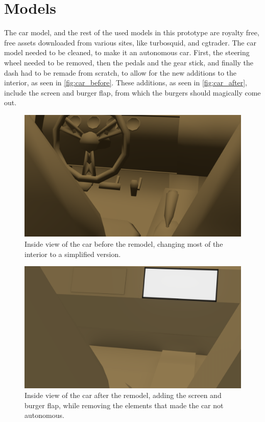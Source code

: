 \section{Models}\label{section:models}
    The car model, and the rest of the used models in this prototype are royalty free, free assets downloaded from various sites, like turbosquid, and cgtrader. The car model needed to be cleaned, to make it an autonomous car. First, the steering wheel needed to be removed, then the pedals and the gear stick, and finally the dash had to be remade from scratch, to allow for the new additions to the interior, as seen in \autoref{fig:car_before}. These additions, as seen in \autoref{fig:car_after}, include the screen and burger flap, from which the burgers should magically come out.

\begin{multicols}{2}
    \begin{figure}[H]
        \centering
        \includegraphics[width=0.99\linewidth]{figure/Implementation/car_before.png}
        \caption{Inside view of the car before the remodel, changing most of the interior to a simplified version.}
        \label{fig:car_before}
    \end{figure}
\columnbreak
    \begin{figure}[H]
        \centering
        \includegraphics[width=0.99\linewidth]{figure/Implementation/car_after.png}
        \caption{Inside view of the car after the remodel, adding the screen and burger flap, while removing the elements that made the car not autonomous.}
        \label{fig:car_after}
    \end{figure}
\end{multicols}